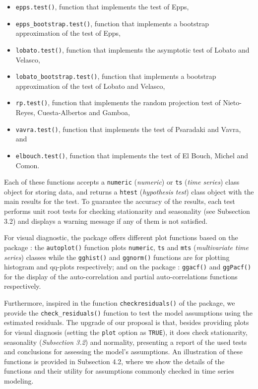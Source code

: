 \begin{itemize}
\item
  \texttt{epps.test()}, function that implements the test of Epps,
\item
  \texttt{epps\_bootstrap.test()}, function that implements a bootstrap approximation of the test of Epps,
\item
  \texttt{lobato.test()}, function that implements the asymptotic test of Lobato and Velasco,
\item
  \texttt{lobato\_bootstrap.test()}, function that implements a bootstrap approximation of the test of Lobato and Velasco,
\item
  \texttt{rp.test()}, function that implements the random projection test of Nieto-Reyes, Cuesta-Albertos and Gamboa,
\item
  \texttt{vavra.test()}, function that implements the test of Psaradaki and Vavra, and
\item
  \texttt{elbouch.test()}, function that implements the test of El Bouch, Michel and Comon.
\end{itemize}

Each of these functions accepts a \texttt{numeric} (\emph{numeric}) or \texttt{ts} (\emph{time series}) class object for storing data, and returns a \texttt{htest} (\emph{hypothesis test}) class object with the main results for the test. To guarantee the accuracy of the results, each test performs unit root tests for checking stationarity and seasonality (see Subsection 3.2) and displays a warning message if any of them is not satisfied.

For visual diagnostic, the package offers different plot functions based on the  package \citep{ggplot2}: the \texttt{autoplot()} function plots \texttt{numeric}, \texttt{ts} and \texttt{mts} (\emph{multivariate time series}) classes while the \texttt{gghist()} and \texttt{ggnorm()} functions are for plotting histogram and qq-plots respectively; and on the  package \citep{Rob2007}: \texttt{ggacf()} and \texttt{ggPacf()} for the display of the auto-correlation and partial auto-correlations functions respectively.

Furthermore, inspired in the function \texttt{checkresiduals()} of the  package, we provide the \texttt{check\_residuals()} function to test the model assumptions using the estimated residuals. The upgrade of our proposal is that, besides providing plots for visual diagnosis (setting the \texttt{plot} option as \texttt{TRUE}), it does check stationarity, seasonality (\emph{Subsection 3.2}) and normality, presenting a report of the used tests and conclusions for assessing the model's assumptions. An illustration of these functions is provided in Subsection 4.2, where we show the details of the functions and their utility for assumptions commonly checked in time series modeling.

